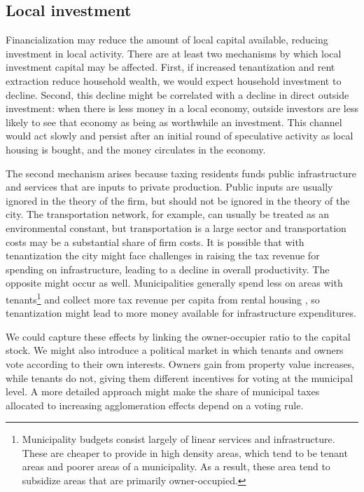 \subsection{Local investment}
Financialization may reduce the amount of local capital available, reducing investment in local activity. %
There are at least two mechanisms by which local investment capital may be affected. First, if increased tenantization and rent extraction reduce household wealth, we would expect household investment to decline. Second, this decline might be correlated with a decline in direct outside investment: when there is less money in a local economy, outside investors are less likely to see that economy as being as worthwhile an investment. This channel would act slowly and persist after an initial round of speculative activity as local housing is bought, and the money circulates in the economy. %

The second mechanism arises because taxing residents funds public infrastructure and services that are inputs to private production. Public inputs are usually ignored in the theory of the firm, but should not be ignored in the theory of the city.  The transportation network, for example, can usually be treated as an environmental constant, but transportation is a large sector and transportation costs may be a substantial share of firm costs. It is possible that with tenantization the city might face challenges in raising the tax revenue for spending on infrastructure, leading to a decline in overall productivity. The opposite might occur as well. Municipalities generally spend less on areas with tenants\footnote{Municipality budgets consist largely of \gls{linear services and infrastructure}. These are cheaper to provide in high density areas, which tend to be tenant areas and poorer areas of a municipality.  As a result, these area tend to subsidize areas that are primarily owner-occupied.} and collect more tax revenue per capita from rental housing \cite{berryReassessingPropertyTax2021}, so tenantization might lead to more money available for %
infrastructure expenditures. 

We could capture these effects by linking the owner-occupier ratio to the capital stock. We might also introduce a political market in which tenants and owners vote according to their own interests. Owners gain from property value increases, while tenants do not, giving them different incentives for voting at the municipal level. A more detailed approach might make the share of municipal taxes allocated to increasing agglomeration effects depend on a voting rule.


